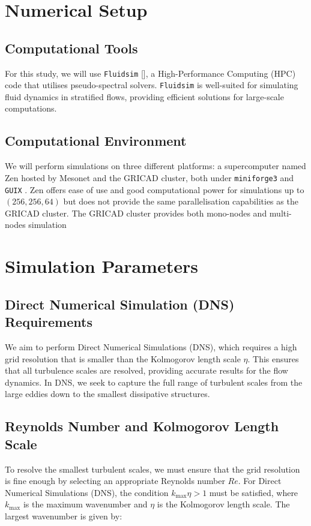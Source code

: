 \documentclass[final,5p,times,twocolumn,authoryear]{elsarticle}
\begin{document}
\section{Numerical Setup}

\subsection{Computational Tools}

For this study, we will use \texttt{Fluidsim} [\cite{fluiddyn}], a High-Performance Computing (HPC) code that utilises pseudo-spectral solvers. \texttt{Fluidsim} is well-suited for simulating fluid dynamics in stratified flows, providing efficient solutions for large-scale computations.

\subsection{Computational Environment}
We will perform simulations on three different platforms: a supercomputer named Zen hosted by Mesonet and the GRICAD cluster, both under \texttt{miniforge3} and \texttt{GUIX} . Zen offers ease of use and good computational power for simulations up to $(256, 256, 64)$ but does not provide the same parallelisation capabilities as the GRICAD cluster. The GRICAD cluster provides both mono-nodes and multi-nodes simulation  

\section{Simulation Parameters}
\subsection{Direct Numerical Simulation (DNS) Requirements}

We aim to perform Direct Numerical Simulations (DNS), which requires a high grid resolution that is smaller than the Kolmogorov length scale $\eta$. This ensures that all turbulence scales are resolved, providing accurate results for the flow dynamics. In DNS, we seek to capture the full range of turbulent scales from the large eddies down to the smallest dissipative structures.

\subsection{Reynolds Number and Kolmogorov Length Scale}

To resolve the smallest turbulent scales, we must ensure that the grid resolution is fine enough by selecting an appropriate Reynolds number $Re$. For Direct Numerical Simulations (DNS), the condition $k_{\text{max}} \eta > 1$ must be satisfied, where $k_{\text{max}}$ is the maximum wavenumber and $\eta$ is the Kolmogorov length scale. The largest wavenumber is given by:
\end{document}
